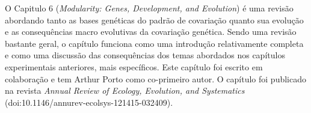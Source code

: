 \begin{refsection}
O Capitulo 6 (\textit{Modularity: Genes, Development, and Evolution}) é uma
revisão abordando tanto as bases genéticas do padrão de covariação quanto sua
evolução e as consequências macro evolutivas da covariação genética. Sendo uma
revisão bastante geral, o capítulo funciona como uma introdução relativamente
completa e como uma discussão das consequências dos temas abordados nos
capítulos experimentais anteriores, mais específicos. Este capítulo foi escrito em
colaboração e tem Arthur Porto como co-primeiro autor. O capítulo foi
publicado na revista \textit{Annual Review of Ecology, Evolution, and
Systematics} (doi:10.1146/annurev-ecolsys-121415-032409).


\printbibliography


\end{refsection}